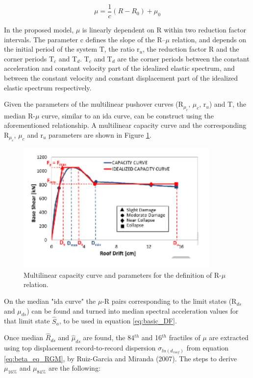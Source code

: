 \begin{equation}
\label{eq:mu_DF}
\mu = \frac{1}{c} (R-R_{0})+\mu_{0}
\end{equation}

In the proposed model, $\mu$ is linearly dependent on R within two reduction factor intervals. The parameter c defines the slope of the R–$\mu$ relation, and depends on the initial period of the system T, the ratio r$_{u}$, the reduction factor R and the corner periods T$_{c}$ and T$_{d}$. T$_{c}$ and T$_{d}$ are the corner periods between the constant acceleration and constant velocity part of the idealized elastic spectrum, and between the constant velocity and constant displacement part of the idealized elastic spectrum respectively.

Given the parameters of the multilinear pushover curves (R$_{\mu_{c}}$, $\mu_{c}$, r$_{u}$) and T, the median R-$\mu$ curve, similar to an ida curve, can be construct using the aforementioned relationship.  A multilinear capacity curve and the corresponding R$_{\mu_{c}}$, $\mu_{c}$ and r$_{u}$ parameters are shown in Figure \ref{fig:quadrilinear_DF}.

\begin{figure}[!htbp]
\centering
\includegraphics[width=10cm]{./figures/quadrilinearDF.jpg}
\caption{Multilinear capacity curve and parameters for the definition of R-$\mu$ relation.}
\label{fig:quadrilinear_DF}
\end{figure}

On the median "ida curve" the $\mu$-R pairs corresponding to the limit states (R$_{ds}$ and $\mu_{ds}$) can be found and turned into median spectral acceleration values for that limit state $\hat{S}_a$, to be used in equation \ref{eq:basic_DF}.

Once median $\hat{R}_{ds}$ and $\hat{\mu}_{ds}$ are found, the 84$^{th}$ and 16$^{th}$ fractiles of $\mu$ are extracted using top displacement record-to-record dispersion $\sigma_{ln(d_{roof})}$ from equation \ref{eq:beta_eq_RGM}, by Ruiz-Garcia and Miranda (2007). The steps to derive $\mu_{16\%}$ and $\mu_{84\%}$ are the following:
 

